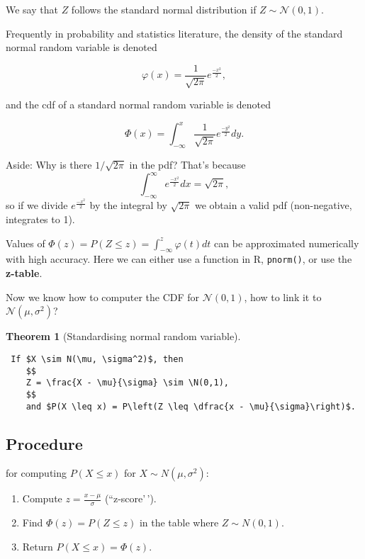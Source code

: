 \documentclass[
]{book}
\providecommand{\tightlist}{%
  \setlength{\itemsep}{0pt}\setlength{\parskip}{0pt}}
\newtheorem{theorem}{Theorem}[chapter]
\theoremstyle{definition}
\theoremstyle{definition}
\theoremstyle{definition}
\theoremstyle{definition}
\theoremstyle{remark}
\begin{document}
We say that \(Z\) follows the standard normal distribution if \(Z \sim \mathcal{N}(0,1)\).

Frequently in probability and statistics literature, the density of the standard normal random variable is denoted

\[
\varphi(x)= \frac{1}{\sqrt{2\pi}}e^{\frac{-x^2}{2}},
\]

and the cdf of a standard normal random variable is denoted

\[
\Phi(x)= \int_{-\infty}^x  \frac{1}{\sqrt{2\pi}}e^{\frac{-y^2}{2}}dy.
\]

Aside: Why is there \(1/\sqrt{2 \pi}\) in the pdf? That's because
\[
    \int_{-\infty}^\infty e^{\frac{-x^2}{2}} dx = \sqrt{2\pi},
    \]
so if we divide \(e^{\frac{-x^2}{2}}\) by the integral by \(\sqrt{2 \pi}\) we obtain a valid pdf (non-negative, integrates to 1).

Values of \(\Phi(z)=P(Z\leq z)=\int_{-\infty}^z \varphi(t)dt\) can be approximated numerically with high accuracy. Here we can either use a function in R, \texttt{pnorm()}, or use the \textbf{z-table}.

Now we know how to computer the CDF for \(\mathcal{N}(0,1)\), how to link it to \(\mathcal{N}(\mu,\sigma^2)\)?

\begin{theorem}[Standardising normal random variable]
\leavevmode

\begin{verbatim}
 If $X \sim N(\mu, \sigma^2)$, then 
    $$
    Z = \frac{X - \mu}{\sigma} \sim \N(0,1),
    $$
    and $P(X \leq x) = P\left(Z \leq \dfrac{x - \mu}{\sigma}\right)$.
\end{verbatim}

\end{theorem}

\subsection{Procedure}\label{procedure}

for computing \(P(X\leq x)\) for \(X\sim N(\mu,\sigma^2)\):

\begin{enumerate}
\def\labelenumi{\arabic{enumi}.}
\tightlist
\item
  Compute \(z=\frac{x-\mu}{\sigma}\) (``z-score'\,').
\item
  Find \(\Phi(z)=P(Z\leq z)\) in the table where \(Z\sim N(0,1)\).
\item
  Return \(P(X\leq x)=\Phi(z)\).
\end{enumerate}
\end{document}
